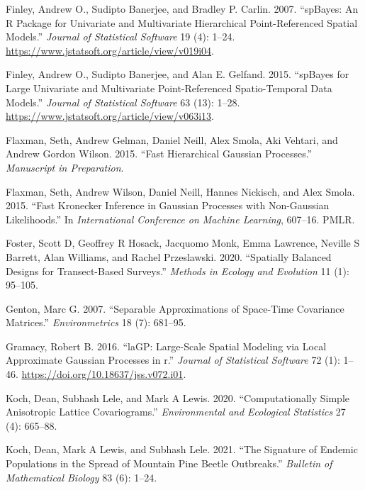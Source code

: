 \begin{CSLReferences}{1}{0}
\leavevmode{}%
Finley, Andrew O., Sudipto Banerjee, and Bradley P. Carlin. 2007. {``{spBayes}: An {R} Package for Univariate and Multivariate Hierarchical Point-Referenced Spatial Models.''} \emph{Journal of Statistical Software} 19 (4): 1--24. \url{https://www.jstatsoft.org/article/view/v019i04}.

\leavevmode{}%
Finley, Andrew O., Sudipto Banerjee, and Alan E. Gelfand. 2015. {``{spBayes} for Large Univariate and Multivariate Point-Referenced Spatio-Temporal Data Models.''} \emph{Journal of Statistical Software} 63 (13): 1--28. \url{https://www.jstatsoft.org/article/view/v063i13}.

\leavevmode{}%
Flaxman, Seth, Andrew Gelman, Daniel Neill, Alex Smola, Aki Vehtari, and Andrew Gordon Wilson. 2015. {``Fast Hierarchical Gaussian Processes.''} \emph{Manuscript in Preparation}.

\leavevmode{}%
Flaxman, Seth, Andrew Wilson, Daniel Neill, Hannes Nickisch, and Alex Smola. 2015. {``Fast Kronecker Inference in Gaussian Processes with Non-Gaussian Likelihoods.''} In \emph{International Conference on Machine Learning}, 607--16. PMLR.

\leavevmode{}%
Foster, Scott D, Geoffrey R Hosack, Jacquomo Monk, Emma Lawrence, Neville S Barrett, Alan Williams, and Rachel Przeslawski. 2020. {``Spatially Balanced Designs for Transect-Based Surveys.''} \emph{Methods in Ecology and Evolution} 11 (1): 95--105.

\leavevmode{}%
Genton, Marc G. 2007. {``Separable Approximations of Space-Time Covariance Matrices.''} \emph{Environmetrics} 18 (7): 681--95.

\leavevmode{}%
Gramacy, Robert B. 2016. {``laGP: Large-Scale Spatial Modeling via Local Approximate Gaussian Processes in r.''} \emph{Journal of Statistical Software} 72 (1): 1--46. \url{https://doi.org/10.18637/jss.v072.i01}.

\leavevmode{}%
Koch, Dean, Subhash Lele, and Mark A Lewis. 2020. {``Computationally Simple Anisotropic Lattice Covariograms.''} \emph{Environmental and Ecological Statistics} 27 (4): 665--88.

\leavevmode{}%
Koch, Dean, Mark A Lewis, and Subhash Lele. 2021. {``The Signature of Endemic Populations in the Spread of Mountain Pine Beetle Outbreaks.''} \emph{Bulletin of Mathematical Biology} 83 (6): 1--24.


\end{CSLReferences}
